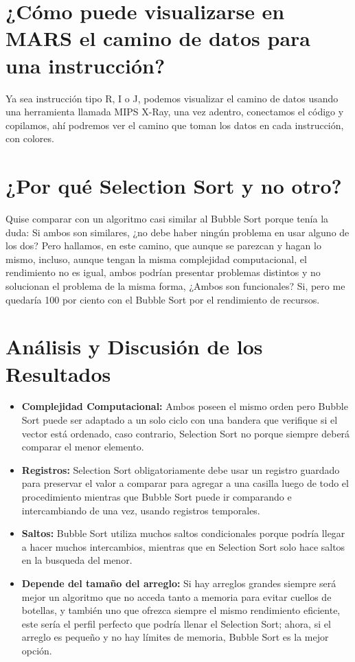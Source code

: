 \documentclass{article}
\begin{document}
\section*{¿Cómo puede visualizarse en MARS el camino de datos para una instrucción?}

Ya sea instrucción tipo R, I o J, podemos visualizar el camino de datos usando una herramienta llamada MIPS X-Ray, una vez adentro, conectamos el código y copilamos, ahí podremos ver el camino que toman los datos en cada instrucción, con colores.

\section*{¿Por qué Selection Sort y no otro?}

Quise comparar con un algoritmo casi similar al Bubble Sort porque tenía la duda: Si ambos son similares, ¿no debe haber ningún problema en usar alguno de los dos? Pero hallamos, en este camino, que aunque se parezcan y hagan lo mismo, incluso, aunque tengan la misma complejidad computacional, el rendimiento no es igual, ambos podrían presentar problemas distintos y no solucionan el problema de la misma forma, ¿Ambos son funcionales? Si, pero me quedaría 100 por ciento con el Bubble Sort por el rendimiento de recursos.

\section*{Análisis y Discusión de los Resultados}

\begin{itemize}
    \item \textbf{Complejidad Computacional: }Ambos poseen el mismo orden pero Bubble Sort puede ser adaptado a un solo ciclo con una bandera que verifique si el vector está ordenado, caso contrario, Selection Sort no porque siempre deberá comparar el menor elemento.

    \item \textbf{Registros: }Selection Sort obligatoriamente debe usar un registro guardado para preservar el valor a comparar para agregar a una casilla luego de todo el procedimiento mientras que Bubble Sort puede ir comparando e intercambiando de una vez, usando registros temporales.

    \item \textbf{Saltos: }Bubble Sort utiliza muchos saltos condicionales porque podría llegar a hacer muchos intercambios, mientras que en Selection Sort solo hace saltos en la busqueda del menor.

    \item \textbf{Depende del tamaño del arreglo: }Si hay arreglos grandes siempre será mejor un algoritmo que no acceda tanto a memoria para evitar cuellos de botellas, y también uno que ofrezca siempre el mismo rendimiento eficiente, este sería el perfil perfecto que podría llenar el Selection Sort; ahora, si el arreglo es pequeño y no hay límites de memoria, Bubble Sort es la mejor opción.
\end{itemize}
\end{document}
